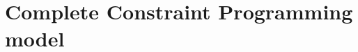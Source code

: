 \documentclass[../../thesis.tex]{subfiles}
\begin{document}
\chapter{Complete Constraint Programming model}
\end{document}
